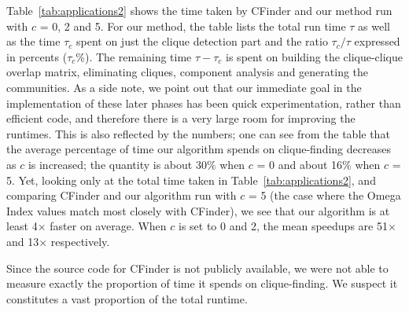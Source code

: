 Table~\ref{tab:applications2} shows the time taken by CFinder and our method 
run with $c$ = 0, 2 and 5. For our method, the table lists the total run time $\tau$ 
as well as the time $\tau_c$ spent on just the clique detection part and the ratio
${\tau_c}/{\tau}$ expressed in percents ($\tau_c$\%).
The remaining time $\tau - \tau_c$ is spent on building the clique-clique overlap matrix, eliminating cliques, component analysis and generating the communities.  As a side note,
we point out that our immediate goal in the implementation of these later phases has been quick experimentation, rather than efficient code, and therefore there is a very large room for improving the runtimes. This is also reflected by the numbers; one can see from the table that the average percentage of time our algorithm spends on clique-finding decreases as $c$ is increased; the quantity is about 30$\%$ when $c$ = 0 and about 16$\%$ when $c$ = 5. Yet, looking only at the total time taken in Table~\ref{tab:applications2}, and comparing CFinder and our algorithm run with $c$ = 5 (the case where the Omega Index values match most closely with CFinder), we see that our algorithm is at least 4$\times$ faster on average. When $c$ is set to 0 and 2, the mean speedups are 51$\times$ and 13$\times$ respectively. 

Since the source code for CFinder is not publicly available, we were not able to measure exactly the proportion of time it spends on clique-finding. 
We suspect it constitutes a vast proportion of the total runtime.


